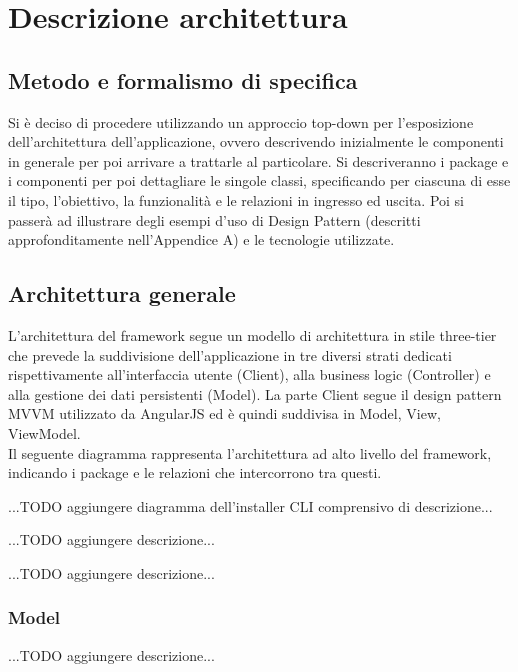 \newpage
\section{Descrizione architettura}
\subsection{Metodo e formalismo di specifica}
Si è deciso di procedere utilizzando un approccio top-down per l'esposizione          dell'architettura dell'applicazione, ovvero descrivendo inizialmente le componenti in generale per poi arrivare a trattarle al particolare.
Si descriveranno i package e i componenti per poi dettagliare le singole classi, specificando per ciascuna di esse il tipo, l'obiettivo, la funzionalità e le relazioni in ingresso ed uscita. Poi si passerà ad illustrare degli esempi d'uso di Design Pattern (descritti approfonditamente nell'Appendice A) e le tecnologie utilizzate.

\subsection{Architettura generale}
L'architettura del framework segue un modello di architettura in stile three-tier che prevede la suddivisione dell'applicazione  in tre diversi strati dedicati rispettivamente all'interfaccia utente (Client), alla business logic (Controller) e alla gestione dei dati persistenti (Model). La parte Client segue il design pattern MVVM utilizzato da AngularJS ed è quindi suddivisa in Model, View, ViewModel.\\

Il seguente diagramma rappresenta l'architettura ad alto livello del framework, indicando i package e le relazioni che intercorrono tra questi.

...TODO aggiungere diagramma dell'installer CLI comprensivo di descrizione...

...TODO aggiungere descrizione...

...TODO aggiungere descrizione...

\newpage
\subsubsection{Model}
...TODO aggiungere descrizione...

